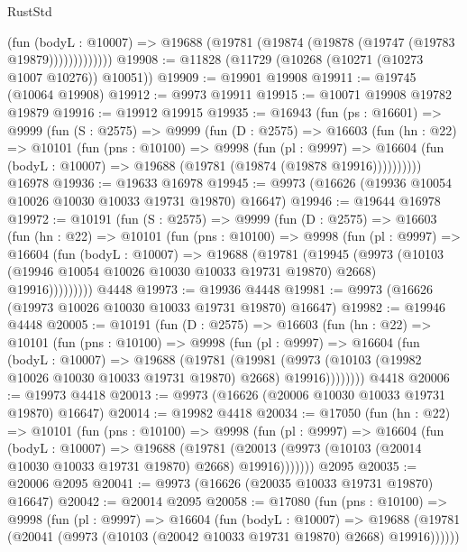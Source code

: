 \begin{lexlean}{RustStd}
\begin{coremodule}
                  (fun (bodyL : @10007) =>
                  @19688 (@19781 (@19874 (@19878 (@19747 (@19783 @19879)))))))))))))
@19908 := @11828 (@11729 (@10268 (@10271 (@10273 @1007 @10276)) @10051))
@19909 := @19901 @19908
@19911 := @19745 (@10064 @19908)
@19912 := @9973 @19911
@19915 := @10071 @19908 @19782 @19879
@19916 := @19912 @19915
@19935 := @16943
    (fun (ps : @16601) =>
    @9999
      (fun (S : @2575) =>
      @9999
        (fun (D : @2575) =>
        @16603
          (fun (hn : @22) =>
          @10101
            (fun (pns : @10100) =>
            @9998
              (fun (pl : @9997) =>
              @16604 (fun (bodyL : @10007) => @19688 (@19781 (@19874 (@19878 @19916))))))))))
    @16978
@19936 := @19633 @16978
@19945 := @9973 (@16626 (@19936 @10054 @10026 @10030 @10033 @19731 @19870) @16647)
@19946 := @19644 @16978
@19972 := @10191
    (fun (S : @2575) =>
    @9999
      (fun (D : @2575) =>
      @16603
        (fun (hn : @22) =>
        @10101
          (fun (pns : @10100) =>
          @9998
            (fun (pl : @9997) =>
            @16604
              (fun (bodyL : @10007) =>
              @19688
                (@19781
                  (@19945
                    (@9973
                      (@10103 (@19946 @10054 @10026 @10030 @10033 @19731 @19870) @2668)
                      @19916)))))))))
    @4448
@19973 := @19936 @4448
@19981 := @9973 (@16626 (@19973 @10026 @10030 @10033 @19731 @19870) @16647)
@19982 := @19946 @4448
@20005 := @10191
    (fun (D : @2575) =>
    @16603
      (fun (hn : @22) =>
      @10101
        (fun (pns : @10100) =>
        @9998
          (fun (pl : @9997) =>
          @16604
            (fun (bodyL : @10007) =>
            @19688
              (@19781
                (@19981
                  (@9973 (@10103 (@19982 @10026 @10030 @10033 @19731 @19870) @2668) @19916))))))))
    @4418
@20006 := @19973 @4418
@20013 := @9973 (@16626 (@20006 @10030 @10033 @19731 @19870) @16647)
@20014 := @19982 @4418
@20034 := @17050
    (fun (hn : @22) =>
    @10101
      (fun (pns : @10100) =>
      @9998
        (fun (pl : @9997) =>
        @16604
          (fun (bodyL : @10007) =>
          @19688
            (@19781 (@20013 (@9973 (@10103 (@20014 @10030 @10033 @19731 @19870) @2668) @19916)))))))
    @2095
@20035 := @20006 @2095
@20041 := @9973 (@16626 (@20035 @10033 @19731 @19870) @16647)
@20042 := @20014 @2095
@20058 := @17080
    (fun (pns : @10100) =>
    @9998
      (fun (pl : @9997) =>
      @16604
        (fun (bodyL : @10007) =>
        @19688 (@19781 (@20041 (@9973 (@10103 (@20042 @10033 @19731 @19870) @2668) @19916))))))

\end{coremodule}
\end{lexlean}
